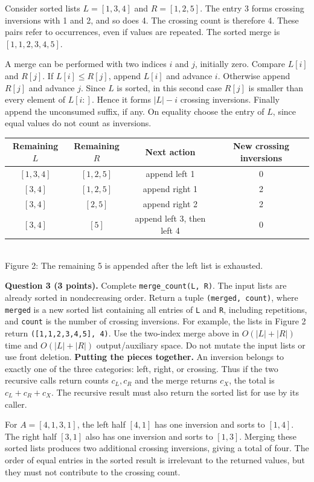 \documentclass[11pt,a4paper]{article}
\newcommand{\code}[1]{\texttt{#1}}
\newcommand{\q}[2]{\medskip\noindent\textbf{Question #1 (#2 points).} }
\begin{document}
Consider sorted lists \(L=[1,3,4]\) and \(R=[1,2,5]\). The entry 3 forms crossing inversions with 1 and 2, and so does 4. The crossing count is therefore 4. These pairs refer to occurrences, even if values are repeated. The sorted merge is \([1,1,2,3,4,5]\).

A merge can be performed with two indices \(i\) and \(j\), initially zero. Compare \(L[i]\) and \(R[j]\). If \(L[i]\le R[j]\), append \(L[i]\) and advance \(i\). Otherwise append \(R[j]\) and advance \(j\). Since \(L\) is sorted, in this second case \(R[j]\) is smaller than every element of \(L[i:]\). Hence it forms \(|L|-i\) crossing inversions. Finally append the unconsumed suffix, if any. On equality choose the entry of \(L\), since equal values do not count as inversions.

\begin{center}
\small\begin{tabular}{c|c|c|c}
Remaining \(L\)&Remaining \(R\)&Next action&New crossing inversions\\\hline
\([1,3,4]\)&\([1,2,5]\)&append left 1&0\\
\([3,4]\)&\([1,2,5]\)&append right 1&2\\
\([3,4]\)&\([2,5]\)&append right 2&2\\
\([3,4]\)&\([5]\)&append left 3, then left 4&0
\end{tabular}\\[6pt]\small Figure 2: The remaining 5 is appended after the left list is exhausted.
\end{center}
\q{3}{3} Complete \code{merge\_count(L, R)}. The input lists are already sorted in nondecreasing order. Return a tuple \code{(merged, count)}, where \code{merged} is a new sorted list containing all entries of \code{L} and \code{R}, including repetitions, and \code{count} is the number of crossing inversions. For example, the lists in Figure 2 return \code{([1,1,2,3,4,5], 4)}. Use the two-index merge above in \(O(|L|+|R|)\) time and \(O(|L|+|R|)\) output/auxiliary space. Do not mutate the input lists or use front deletion.
\newpage
\textbf{Putting the pieces together.} An inversion belongs to exactly one of the three categories: left, right, or crossing. Thus if the two recursive calls return counts \(c_L,c_R\) and the merge returns \(c_X\), the total is \(c_L+c_R+c_X\). The recursive result must also return the sorted list for use by its caller.

For \(A=[4,1,3,1]\), the left half \([4,1]\) has one inversion and sorts to \([1,4]\). The right half \([3,1]\) also has one inversion and sorts to \([1,3]\). Merging these sorted lists produces two additional crossing inversions, giving a total of four. The order of equal entries in the sorted result is irrelevant to the returned values, but they must not contribute to the crossing count.
\end{document}
